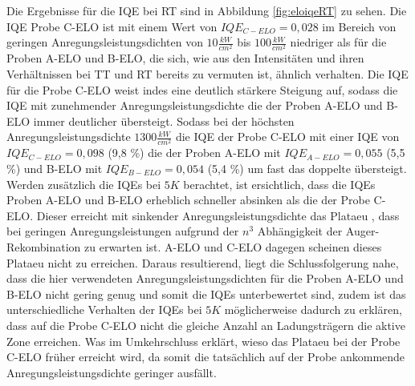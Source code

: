 \noindent 
%
Die Ergebnisse für die IQE bei RT sind in Abbildung \ref{fig:eloiqeRT} zu sehen. Die IQE Probe C-ELO ist mit einem Wert von $IQE_{C-ELO} = 0,028$ im Bereich von geringen Anregungsleistungsdichten von $ 10 \frac{kW}{cm^2} $ bis $ 100 \frac{kW}{cm^2} $ niedriger als für die Proben A-ELO und B-ELO, die sich, wie aus den Intensitäten und ihren Verhältnissen bei TT und RT bereits zu vermuten ist, ähnlich verhalten. 
Die IQE für die Probe C-ELO weist indes eine deutlich stärkere Steigung auf, sodass die IQE mit zunehmender Anregungsleistungsdichte die der Proben A-ELO und B-ELO immer deutlicher übersteigt. Sodass bei der höchsten Anregungsleistungsdichte $ 1300 \frac{kW}{cm^2} $ die IQE der Probe C-ELO mit einer IQE von $IQE_{C-ELO} = 0,098$ (9,8 \%) die der Proben A-ELO mit $IQE_{A-ELO} = 0,055$ (5,5 \%) und B-ELO mit $IQE_{B-ELO} = 0,054$ (5,4 \%) um fast das doppelte übersteigt. Werden zusätzlich die IQEs bei $5K$ berachtet, ist ersichtlich, dass die IQEs Proben A-ELO und B-ELO erheblich schneller absinken als die der Probe C-ELO. Dieser erreicht mit sinkender Anregungsleistungsdichte das Plataeu , dass bei geringen Anregungsleistungen aufgrund der $n^3$ Abhängigkeit der Auger-Rekombination zu erwarten ist. A-ELO und C-ELO dagegen scheinen dieses Plataeu nicht zu erreichen. Daraus resultierend, liegt die Schlussfolgerung nahe, dass die hier verwendeten Anregungsleistungsdichten für die Proben A-ELO und B-ELO nicht gering genug und somit die IQEs unterbewertet sind, zudem ist das unterschiedliche Verhalten der IQEs bei $5K$ möglicherweise dadurch zu erklären, dass auf die Probe C-ELO nicht die gleiche Anzahl an Ladungsträgern die aktive Zone erreichen. Was im Umkehrschluss erklärt, wieso das Plataeu bei der Probe C-ELO früher erreicht wird, da somit die tatsächlich auf der Probe ankommende Anregungsleistungsdichte geringer ausfällt.  
%
